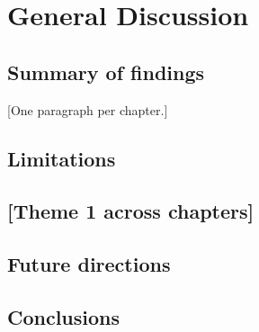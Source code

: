 \chapter{General Discussion}
\label{ch:discussion}

\section{Summary of findings}
[One paragraph per chapter.]

\section{Limitations}
\section{[Theme 1 across chapters]}
\section{Future directions}
\section{Conclusions}
